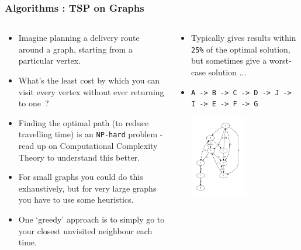 
\begin{frame}[fragile]
\frametitle{Algorithms : TSP on Graphs}
\begin{columns}[T]

\begin{column}{0.45\textwidth}
\begin{itemize}[<+->]
\item Imagine planning a delivery route around a graph, starting from a particular vertex.
\item What's the least cost by which you can visit every vertex without ever returning to one~?
\item Finding the optimal path (to reduce travelling time) is an \verb^NP-hard^ problem - 
read up on Computational Complexity Theory to understand this better.
\item For small graphs you could do this exhaustively, but for very large graphs you have
to use some heuristics.
\item One `greedy' approach is to simply go to your closest unvisited neighbour each time.
\end{itemize}
\end{column}

\pause
\begin{column}{0.45\textwidth}
\begin{itemize}[<+->]
\item Typically gives results within \verb^25%^
of the optimal solution, but sometimes give a worst-case solution $\ldots$
\item 
{\scriptsize \verb^A -> B -> C -> D -> J -> I -> E -> F -> G^}

\begin{center}
\includegraphics[width=0.5\textwidth]{../Images/Linkedg.pdf}
\end{center}
\end{itemize}
\end{column}

\end{columns}
\end{frame}

